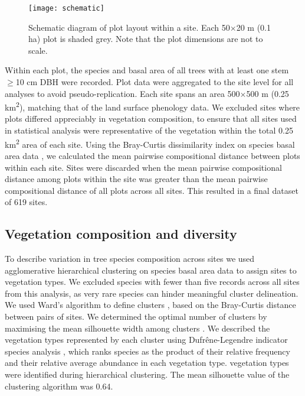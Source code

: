 \documentclass[11pt,a4paper]{article}
\begin{document}
\begin{figure}[H]
\centering
	\texttt{[image: schematic]}
	\caption{Schematic diagram of plot layout within a site. Each 50$\times$20
		m (0.1 ha) plot is shaded grey. Note that the plot dimensions are not to
		scale.}
	\label{schematic}
\end{figure}

Within each plot, the species and basal area of all trees with at least one
stem $\geq$10 cm DBH were recorded. Plot data were aggregated to the site level
for all analyses to avoid pseudo-replication. Each site spans an area
500$\times$500 m (0.25 km\textsuperscript{2}), matching that of the land
surface phenology data. We excluded sites where plots differed appreciably in
vegetation composition, to ensure that all sites used in statistical analysis
were representative of the vegetation within the total 0.25
km\textsuperscript{2} area of each site. Using the Bray-Curtis dissimilarity
index on species basal area data \citep{Faith1987}, we calculated the mean
pairwise compositional distance between plots within each site. Sites were
discarded when the mean pairwise compositional distance among plots within the
site was greater than the mean pairwise compositional distance of all plots
across all sites. This resulted in a final dataset of 619 sites.

\subsection{Vegetation composition and diversity} 

To describe variation in tree species composition across sites we used
agglomerative hierarchical clustering on species basal area data
\citep{Kreft2010, Fayolle2014} to assign sites to vegetation types. We excluded
species with fewer than five records across all sites from this analysis, as
very rare species can hinder meaningful cluster delineation. We used Ward's
algorithm to define clusters \citep{Murtagh2014}, based on the Bray-Curtis
distance between pairs of sites. We determined the optimal number of clusters
by maximising the mean silhouette width among clusters \citep{Rousseeuw1987}.
We described the vegetation types represented by each cluster using
Dufr\^{e}ne-Legendre indicator species analysis \citep{Dufrene1997}, which
ranks species as the product of their relative frequency and their relative
average abundance in each vegetation type.  vegetation types
were identified during hierarchical clustering. The mean silhouette value of
the clustering algorithm was 0.64. 
\end{document}
